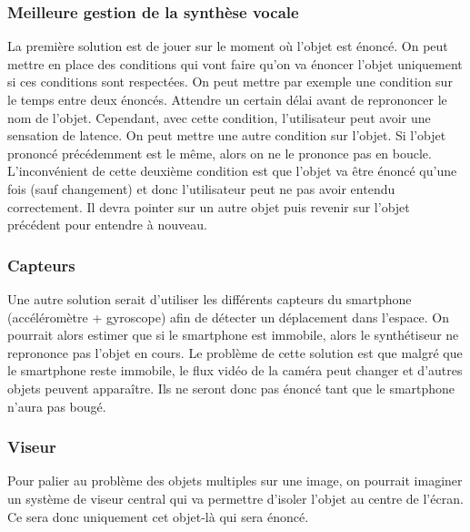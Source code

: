 \documentclass[UTF8]{EPURapport}
\begin{document}
\subsubsection{Meilleure gestion de la synthèse vocale}
La première solution est de jouer sur le moment où l'objet est énoncé. On peut mettre en place des conditions qui vont faire qu'on va énoncer l'objet uniquement si ces conditions sont respectées. On peut mettre par exemple une condition sur le temps entre deux énoncés. Attendre un certain délai avant de reprononcer le nom de l'objet. Cependant, avec cette condition, l'utilisateur peut avoir une sensation de latence. On peut mettre une autre condition sur l'objet. Si l'objet prononcé précédemment est le même, alors on ne le prononce pas en boucle. L'inconvénient de cette deuxième condition est que l'objet va être énoncé qu'une fois (sauf changement) et donc l'utilisateur peut ne pas avoir entendu correctement. Il devra pointer sur un autre objet puis revenir sur l'objet précédent pour entendre à nouveau.
\subsubsection{Capteurs}
Une autre solution serait d'utiliser les différents capteurs du smartphone (accéléromètre + gyroscope) afin de détecter un déplacement dans l'espace. On pourrait alors estimer que si le smartphone est immobile, alors le synthétiseur ne reprononce pas l'objet en cours. Le problème de cette solution est que malgré que le smartphone reste immobile, le flux vidéo de la caméra peut changer et d'autres objets peuvent apparaître. Ils ne seront donc pas énoncé tant que le smartphone n'aura pas bougé.
\subsubsection{Viseur}
Pour palier au problème des objets multiples sur une image, on pourrait imaginer un système de viseur central qui va permettre d'isoler l'objet au centre de l'écran. Ce sera donc uniquement cet objet-là qui sera énoncé.
\end{document}
